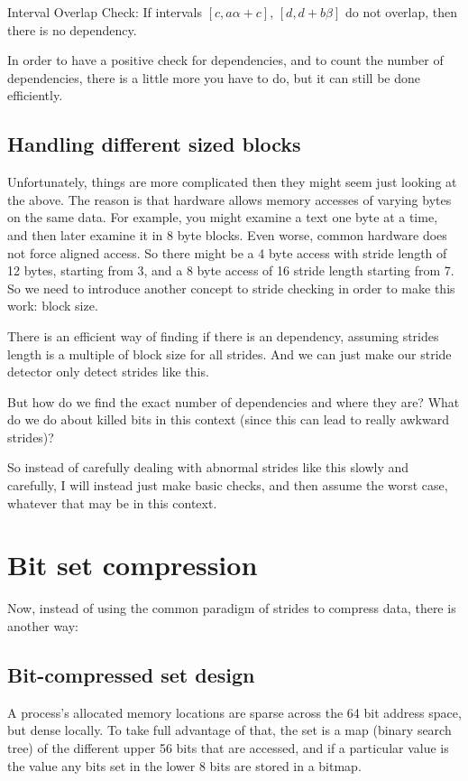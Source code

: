 \documentclass[12pt,twoside]{reedthesis}
\begin{document}
		Interval Overlap Check: If intervals $[c,a\alpha+c]$, $[d,d+b\beta]$ do not overlap, then there is no dependency.

		In order to have a positive check for dependencies, and to count the number of dependencies, there is a little more you have to do, but it can still be done efficiently.

		\subsection{Handling different sized blocks}

		Unfortunately, things are more complicated then they might seem just looking at the above.
		The reason is that hardware allows memory accesses of varying bytes on the same data. For example, you might examine a text one byte at a time, and then later examine it in 8 byte blocks. Even worse, common hardware does not force aligned access. So there might be a 4 byte access with stride length of 12 bytes, starting from 3, and a 8 byte access of 16 stride length starting from 7. So we need to introduce another concept to stride checking in order to make this work: block size.

		There is an efficient way of finding if there is an dependency, assuming strides length is a multiple of block size for all strides. And we can just make our stride detector only detect strides like this.

		But how do we find the exact number of dependencies and where they are? What do we do about killed bits in this context (since this can lead to really awkward strides)?

		So instead of carefully dealing with abnormal strides like this slowly and carefully, I will instead just make basic checks, and then assume the worst case, whatever that may be in this context.

	\section{Bit set compression}

		Now, instead of using the common paradigm of strides to compress data, there is another way:

		\subsection{Bit-compressed set design}

		A process's allocated memory locations are sparse across the 64 bit address space, but dense locally. To take full advantage of that, the set is a map (binary search tree) of the different upper 56 bits that are accessed, and if a particular value is  the value any bits set in the lower 8 bits are stored in a bitmap.
\end{document}
